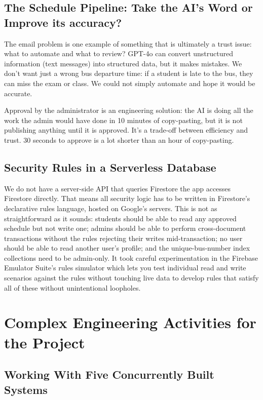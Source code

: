 \documentclass[12pt,a4paper]{report}
\begin{document}
\subsection*{The Schedule Pipeline: Take the AI's Word or Improve its accuracy?}
	
	The email problem is one example of something that is ultimately a trust issue: what to automate and what to review? GPT-4o can convert unstructured information (text messages) into structured data, but it makes mistakes. We don't want just a wrong bus departure time: if a student is late to the bus, they can miss the exam or class. We could not simply automate and hope it would be accurate.
	
	Approval by the administrator is an engineering solution: the AI is doing all the work the admin would have done in 10 minutes of copy-pasting, but it is not publishing anything until it is approved. It's a trade-off between efficiency and trust. 30 seconds to approve is a lot shorter than an hour of copy-pasting.
\subsection*{Security Rules in a Serverless Database}

We do not have a server-side API that queries Firestore the app accesses Firestore directly. That means all security logic has to be written in Firestore's declarative rules language, hosted on Google's servers. This is not as straightforward as it sounds: students should be able to read any approved schedule but not write one; admins should be able to perform cross-document transactions without the rules rejecting their writes mid-transaction; no user should be able to read another user's profile; and the unique-bus-number index collections need to be admin-only. It took careful experimentation in the Firebase Emulator Suite's rules simulator which lets you test individual read and write scenarios against the rules without touching live data to develop rules that satisfy all of these without unintentional loopholes.

\section{Complex Engineering Activities for the Project}

\subsection*{Working With Five Concurrently Built Systems}
\end{document}
